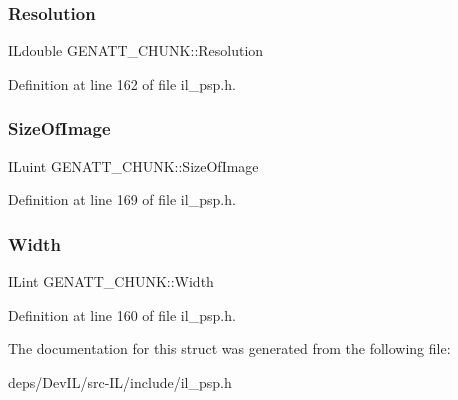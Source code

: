 \subsubsection{\texorpdfstring{Resolution}{Resolution}}
{\footnotesize\ttfamily I\+Ldouble G\+E\+N\+A\+T\+T\+\_\+\+C\+H\+U\+N\+K\+::\+Resolution}



Definition at line 162 of file il\+\_\+psp.\+h.

\mbox{\label{structGENATT__CHUNK_a6b0263b9667615c27ca04de3e0ce36e7}} 
\subsubsection{\texorpdfstring{Size\+Of\+Image}{SizeOfImage}}
{\footnotesize\ttfamily I\+Luint G\+E\+N\+A\+T\+T\+\_\+\+C\+H\+U\+N\+K\+::\+Size\+Of\+Image}



Definition at line 169 of file il\+\_\+psp.\+h.

\mbox{\label{structGENATT__CHUNK_a9973d2ddc30ab78ab1d79bd44abc9d77}} 
\subsubsection{\texorpdfstring{Width}{Width}}
{\footnotesize\ttfamily I\+Lint G\+E\+N\+A\+T\+T\+\_\+\+C\+H\+U\+N\+K\+::\+Width}



Definition at line 160 of file il\+\_\+psp.\+h.



The documentation for this struct was generated from the following file\+:\begin{DoxyCompactItemize}
\item 
deps/\+Dev\+I\+L/src-\/\+I\+L/include/il\+\_\+psp.\+h\end{DoxyCompactItemize}
